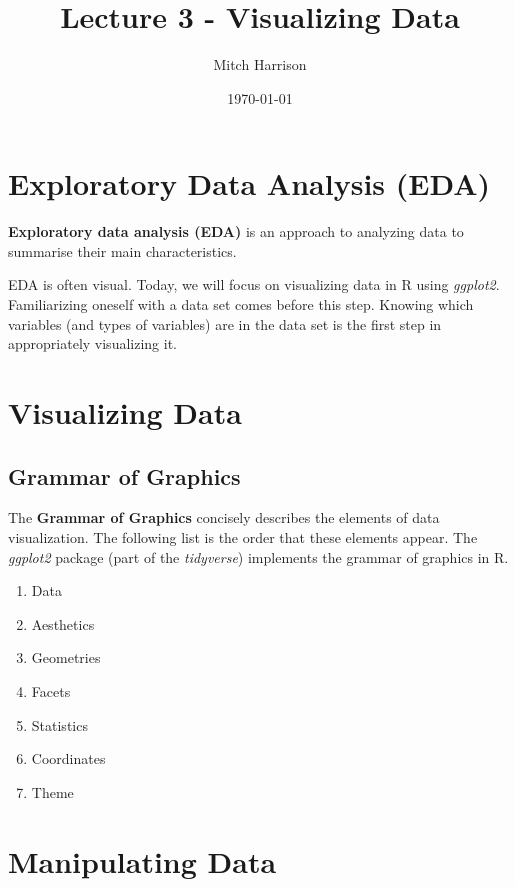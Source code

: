 \documentclass[titlepage, 12pt, leqno]{article}
\title{\Huge{Lecture 3 - Visualizing Data}}
\author{\large{Mitch Harrison}}
\date{\today}
\begin{document}
\setlength{\parskip}{1\baselineskip}
\setlength{\parindent}{15pt}
\maketitle
\tableofcontents
\newpage


\section{Exploratory Data Analysis (EDA)}

\begin{definition}
    \textbf{Exploratory data analysis (EDA)} is an approach to analyzing data to summarise their main characteristics.
\end{definition}

EDA is often visual. Today, we will focus on visualizing data in R using \textit{ggplot2}. Familiarizing oneself with a data set comes before this step. Knowing which variables (and types of variables) are in the data set is the first step in appropriately visualizing it.
\pagebreak

\section{Visualizing Data}
\subsection{Grammar of Graphics}
The \textbf{Grammar of Graphics} concisely describes the elements of data visualization. The following list is the order that these elements appear. The \textit{ggplot2} package (part of the \textit{tidyverse}) implements the grammar of graphics in R.
\begin{enumerate}
    \item Data
    \item Aesthetics
    \item Geometries
    \item Facets
    \item Statistics
    \item Coordinates
    \item Theme
\end{enumerate}
\pagebreak
\section{Manipulating Data}
\end{document}
